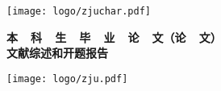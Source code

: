 \cleardoublepage{}

\hskip 40mm

\begin{center}
    \texttt{[image: logo/zjuchar.pdf]}
\end{center}

\begin{center}
     \heiti \bfseries
    本~~科~~生~~毕~~业~~论~~文（论~~文）
    \\ \vskip 24pt
    文献综述和开题报告
\end{center}

\vskip 40pt

\begin{center}
    \texttt{[image: logo/zju.pdf]}
\end{center}

